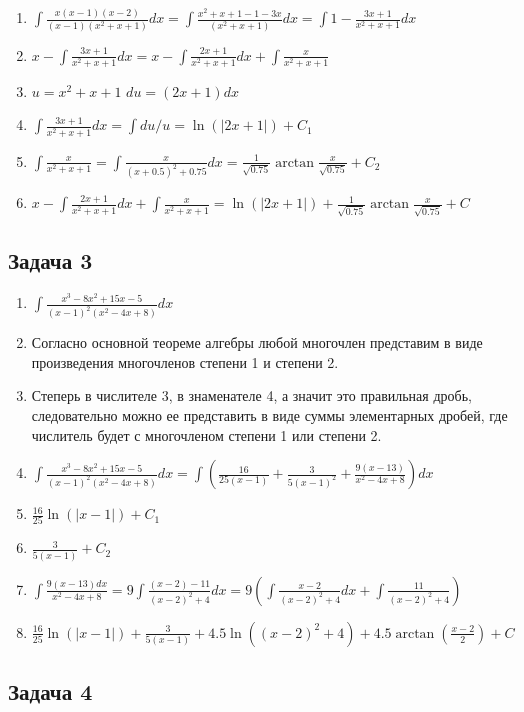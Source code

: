 \documentclass[a4paper,12pt]{article}
\begin{document}
\begin{enumerate}
    \item $\int \frac{x(x-1)(x-2)}{(x-1)(x^2+x+1)}dx = \int \frac{x^2+x+1-1-3x}{(x^2+x+1)}dx = \int 1 - \frac{3x+1}{x^2+x+1}dx$
    \item $x - \int \frac{3x+1}{x^2+x+1} dx = x - \int \frac{2x+1}{x^2+x+1}dx + \int \frac{x}{x^2+x+1}$
    \item $u = x^2+x+1$ $du = (2x + 1)dx$
    \item $\int \frac{3x+1}{x^2+x+1} dx = \int du/u = \ln(|2x+1|)+C_1$
    \item $\int \frac{x}{x^2+x+1} = \int \frac{x}{(x+0.5)^2+0.75}dx = \frac{1}{\sqrt{0.75}}\arctan{\frac{x}{\sqrt{0.75}}}+C_2$
    \item $x - \int \frac{2x+1}{x^2+x+1}dx + \int \frac{x}{x^2+x+1} = \ln(|2x+1|) + \frac{1}{\sqrt{0.75}}\arctan{\frac{x}{\sqrt{0.75}}} + C$
\end{enumerate}

\subsection{Задача 3}

\begin{enumerate}
    \item $\int \frac{x^3-8x^2+15x-5}{(x-1)^2(x^2-4x+8)}dx$
    \item Согласно основной теореме алгебры любой многочлен представим в виде произведения многочленов степени 1 и степени 2.
    \item Степерь в числителе 3, в знаменателе 4, а значит это правильная дробь, следовательно можно ее представить в виде суммы элементарных дробей, где числитель будет с многочленом степени 1 или степени 2.
    \item $\int \frac{x^3-8x^2+15x-5}{(x-1)^2(x^2-4x+8)} dx= \int (\frac{16}{25(x-1)} + \frac{3}{5(x-1)^2} + \frac{9(x-13)}{x^2-4x+8})dx$
    \item $\frac{16}{25}\ln(|x-1|)+C_1$
    \item $\frac{3}{5(x-1)} + C_2$
    \item $\int \frac{9(x-13)dx}{x^2-4x+8} = 9 \int \frac{(x-2)-11}{(x-2)^2+4}dx = 9(\int \frac{x-2}{(x-2)^2+4}dx + \int \frac{11}{(x-2)^2+4})$
    \item $\frac{16}{25}\ln(|x-1|) +\frac{3}{5(x-1)} +  4.5\ln((x-2)^2+4)+4.5\arctan(\frac{x-2}{2})+C$
\end{enumerate}

\subsection{Задача 4}
\end{document}
